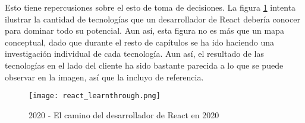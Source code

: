 Esto tiene repercusiones sobre el esto de toma de decisiones. La figura \cref{fig:react-learnthrough} intenta ilustrar la cantidad de tecnologías que un desarrollador de React debería conocer para dominar todo su potencial. Aun así, esta figura no es más que un mapa conceptual, dado que durante el resto de capítulos se ha ido haciendo una investigación individual de cada tecnología. Aun así, el resultado de las tecnologías en el lado del cliente ha sido bastante parecida a lo que se puede observar en la imagen, así que la incluyo de referencia.

\begin{figure}
  \centering
  \texttt{[image: react\_learnthrough.png]}
  \caption{2020 - El camino del desarrollador de React en 2020}
  \label{fig:react-learnthrough}
\end{figure}

